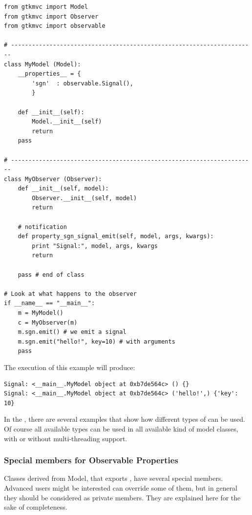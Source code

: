 { \codesize 
\begin{verbatim} 
from gtkmvc import Model
from gtkmvc import Observer
from gtkmvc import observable

# ----------------------------------------------------------------------
class MyModel (Model):
    __properties__ = {
        'sgn'  : observable.Signal(),
        }

    def __init__(self):
        Model.__init__(self)
        return    
    pass

# ----------------------------------------------------------------------
class MyObserver (Observer):
    def __init__(self, model):
        Observer.__init__(self, model)
        return

    # notification
    def property_sgn_signal_emit(self, model, args, kwargs):
        print "Signal:", model, args, kwargs
        return

    pass # end of class

# Look at what happens to the observer
if __name__ == "__main__":
    m = MyModel()
    c = MyObserver(m)
    m.sgn.emit() # we emit a signal
    m.sgn.emit("hello!", key=10) # with arguments
    pass
\end{verbatim}
}

The execution of this example will produce:

{ \codesize 
\begin{verbatim} 
Signal: <__main__.MyModel object at 0xb7de564c> () {}
Signal: <__main__.MyModel object at 0xb7de564c> ('hello!',) {'key': 10}
\end{verbatim}
}

In the , there are several examples that show how
different types of \OPS can be used. Of course all available types can
be used in all available kind of model classes, with or without
multi-threading support.

  
\subsubsection{Special members for Observable Properties}
Classes derived from Model, that exports \OPS, have several special
members. Advanced users might be interested can override some of them,
but in general they should be considered as private members. They are
explained here for the sake of completeness.


